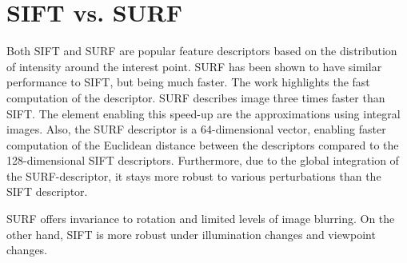 \section{SIFT vs. SURF}
Both SIFT and SURF are popular feature descriptors based on the distribution of intensity around the interest point.
SURF has been shown to have similar performance to SIFT, but being much faster. 
The work \cite{surf2006} highlights the fast computation of the descriptor.
SURF describes image three times faster than SIFT. 
The element enabling this speed-up are the approximations using integral images. 
Also, the SURF descriptor is a 64-dimensional vector, enabling faster computation of the Euclidean distance between the descriptors compared to the 128-dimensional SIFT descriptors. %
Furthermore, due to the global integration of the SURF-descriptor, it stays more robust to various perturbations than the SIFT descriptor. 

SURF offers invariance to rotation and limited levels of image blurring.
On the other hand, SIFT is more robust under illumination changes and viewpoint changes. 



